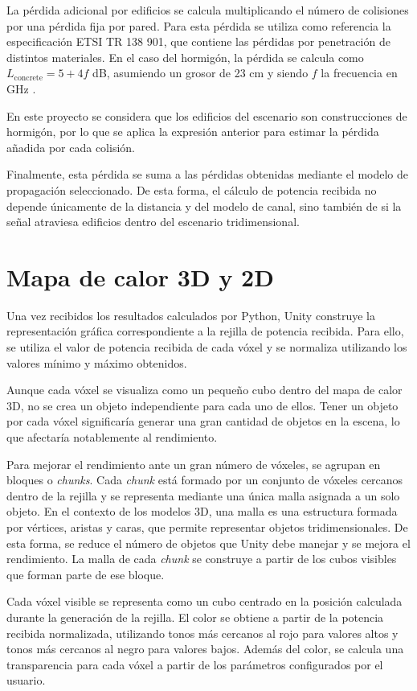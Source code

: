 La pérdida adicional por edificios se calcula multiplicando el número de colisiones por una pérdida fija por pared. Para esta pérdida se utiliza como referencia la especificación ETSI TR 138 901, que contiene las pérdidas por penetración de distintos materiales. En el caso del hormigón, la pérdida se calcula como $L_\mathrm{concrete} = 5 + 4f$ dB, asumiendo un grosor de 23 cm y siendo $f$ la frecuencia en GHz \cite{etsi138901}.

En este proyecto se considera que los edificios del escenario son construcciones de hormigón, por lo que se aplica la expresión anterior para estimar la pérdida añadida por cada colisión.

Finalmente, esta pérdida se suma a las pérdidas obtenidas mediante el modelo de propagación seleccionado. De esta forma, el cálculo de potencia recibida no depende únicamente de la distancia y del modelo de canal, sino también de si la señal atraviesa edificios dentro del escenario tridimensional.


\section{Mapa de calor 3D y 2D}

Una vez recibidos los resultados calculados por Python, Unity construye la representación gráfica correspondiente a la rejilla de potencia recibida. Para ello, se utiliza el valor de potencia recibida de cada vóxel y se normaliza utilizando los valores mínimo y máximo obtenidos.

Aunque cada vóxel se visualiza como un pequeño cubo dentro del mapa de calor 3D, no se crea un objeto independiente para cada uno de ellos. Tener un objeto por cada vóxel significaría generar una gran cantidad de objetos en la escena, lo que afectaría notablemente al rendimiento.

Para mejorar el rendimiento ante un gran número de vóxeles, se agrupan en bloques o \textit{chunks}. Cada \textit{chunk} está formado por un conjunto de vóxeles cercanos dentro de la rejilla y se representa mediante una única malla asignada a un solo objeto. En el contexto de los modelos 3D, una malla es una estructura formada por vértices, aristas y caras, que permite representar objetos tridimensionales. De esta forma, se reduce el número de objetos que Unity debe manejar y se mejora el rendimiento. La malla de cada \textit{chunk} se construye a partir de los cubos visibles que forman parte de ese bloque.

Cada vóxel visible se representa como un cubo centrado en la posición calculada durante la generación de la rejilla. El color se obtiene a partir de la potencia recibida normalizada, utilizando tonos más cercanos al rojo para valores altos y tonos más cercanos al negro para valores bajos. Además del color, se calcula una transparencia para cada vóxel a partir de los parámetros configurados por el usuario.

